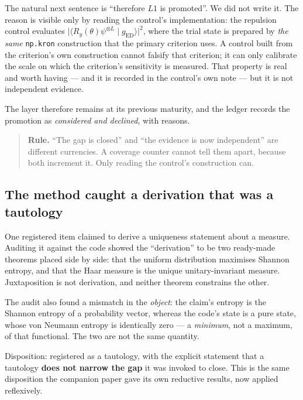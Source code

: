 \documentclass[11pt,a4paper]{article}
\newcommand{\code}[1]{\texttt{\small #1}}
\begin{document}
The natural next sentence is ``therefore $L1$ is promoted''. We did not write it.
The reason is visible only by reading the control's implementation: the
repulsion control evaluates
$\bigl|\langle R_y(\theta)\psi^{\otimes L}\mid g_{\mathrm{ED}}\rangle\bigr|^2$,
where the trial state is prepared by \emph{the same} \code{np.kron} construction
that the primary criterion uses. A control built from the criterion's own
construction cannot falsify that criterion; it can only calibrate the scale on
which the criterion's sensitivity is measured. That property is real and worth
having --- and it is recorded in the control's own note --- but it is not
independent evidence.

The layer therefore remains at its previous maturity, and the ledger records the
promotion as \emph{considered and declined}, with reasons.

\begin{quote}\small
\textbf{Rule.} ``The gap is closed'' and ``the evidence is now independent'' are
different currencies. A coverage counter cannot tell them apart, because both
increment it. Only reading the control's construction can.
\end{quote}

\subsection{The method caught a derivation that was a tautology}
\label{sec:tautology}

One registered item claimed to derive a uniqueness statement about a measure.
Auditing it against the code showed the ``derivation'' to be two ready-made
theorems placed side by side: that the uniform distribution maximises Shannon
entropy, and that the Haar measure is the unique unitary-invariant measure.
Juxtaposition is not derivation, and neither theorem constrains the other.

The audit also found a mismatch in the \emph{object}: the claim's entropy is the
Shannon entropy of a probability vector, whereas the code's state is a pure
state, whose von Neumann entropy is identically zero --- a \emph{minimum}, not a
maximum, of that functional. The two are not the same quantity.

Disposition: registered as a tautology, with the explicit statement that a
tautology \textbf{does not narrow the gap} it was invoked to close. This is the
same disposition the companion paper gave its own reductive results, now applied
reflexively.
\end{document}
